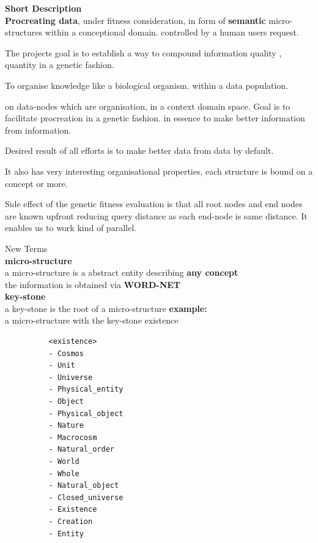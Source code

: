 \documentclass[15pt]{article}
\begin{document}
\begin{center}


{\bf Short Description} \\[0.45cm]

\textbf{Procreating data}, under fitness consideration,
      in form of \textbf{semantic} micro-structures 
      within a conceptional domain.
      controlled by a human users request.
\vskip0.5cm


\begin{flushleft}


The projects goal is to establish a way to compound information quality  , quantity in a genetic fashion.

\vskip0.5cm

To organise knowledge like a biological organism. within a data population.

on data-nodes which are organisation,
in a context domain space.
Goal is to facilitate procreation in a genetic fashion. in essence to make better information from information.

Desired result of all efforts is to make better data from data by default.

It also has very interesting organisational properties,
each structure is bound on a concept or more.

Side effect of the genetic fitness evaluation
is that all root nodes and end nodes are known upfront reducing
query distance as each end-node is same distance.
It enables us to work kind of parallel.

\end{flushleft}




{\small New Terms } \\[0.1cm]
\textbf
{micro-structure}\\  
a micro-structure is a abstract entity describing 
\textbf{any concept}\\
the information is obtained via \textbf{WORD-NET}\\
\vskip0.4cm
\textbf
{key-stone}\\  
a key-stone is the root of a micro-structure 
\vskip0.4cm
\textbf
{example:}\\  
a micro-structure with the key-stone existence
\vskip0.2cm

\end{center}


          \begin{verbatim}
          <existence>
          - Cosmos
          - Unit
          - Universe
          - Physical_entity
          - Object
          - Physical_object
          - Nature
          - Macrocosm
          - Natural_order
          - World
          - Whole
          - Natural_object
          - Closed_universe
          - Existence
          - Creation
          - Entity
          \end{verbatim}
\end{document}
